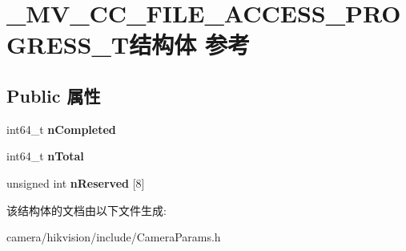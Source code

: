 \hypertarget{struct___m_v___c_c___f_i_l_e___a_c_c_e_s_s___p_r_o_g_r_e_s_s___t}{}\section{\+\_\+\+M\+V\+\_\+\+C\+C\+\_\+\+F\+I\+L\+E\+\_\+\+A\+C\+C\+E\+S\+S\+\_\+\+P\+R\+O\+G\+R\+E\+S\+S\+\_\+\+T结构体 参考}
\label{struct___m_v___c_c___f_i_l_e___a_c_c_e_s_s___p_r_o_g_r_e_s_s___t}
\subsection*{Public 属性}
\begin{DoxyCompactItemize}
\item 
\mbox{\label{struct___m_v___c_c___f_i_l_e___a_c_c_e_s_s___p_r_o_g_r_e_s_s___t_afe5c39fcc87e75751353bd12286737c7}} 
int64\+\_\+t {\bfseries n\+Completed}
\item 
\mbox{\label{struct___m_v___c_c___f_i_l_e___a_c_c_e_s_s___p_r_o_g_r_e_s_s___t_a3e93a1876eadc94880f5a96f0339b390}} 
int64\+\_\+t {\bfseries n\+Total}
\item 
\mbox{\label{struct___m_v___c_c___f_i_l_e___a_c_c_e_s_s___p_r_o_g_r_e_s_s___t_a6b7d31bc27afd2d3b75171c09cdf63d5}} 
unsigned int {\bfseries n\+Reserved} \mbox{[}8\mbox{]}
\end{DoxyCompactItemize}


该结构体的文档由以下文件生成\+:\begin{DoxyCompactItemize}
\item 
camera/hikvision/include/Camera\+Params.\+h\end{DoxyCompactItemize}
